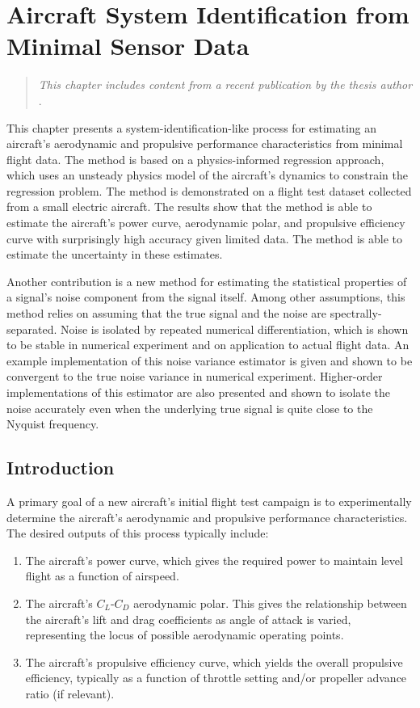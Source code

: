 \chapter{Aircraft System Identification from Minimal Sensor Data}
\label{chap:aircraft_sysid}

\begin{quote}
    \emph{This chapter includes content from a recent publication by the thesis author} \cite{sharpe_physicsinformed_2024}.
\end{quote}

This chapter presents a system-identification-like process for estimating an aircraft's aerodynamic and propulsive performance characteristics from minimal flight data. The method is based on a physics-informed regression approach, which uses an unsteady physics model of the aircraft's dynamics to constrain the regression problem. The method is demonstrated on a flight test dataset collected from a small electric aircraft. The results show that the method is able to estimate the aircraft's power curve, aerodynamic polar, and propulsive efficiency curve with surprisingly high accuracy given limited data. The method is able to estimate the uncertainty in these estimates.

Another contribution is a new method for estimating the statistical properties of a signal's noise component from the signal itself. Among other assumptions, this method relies on assuming that the true signal and the noise are spectrally-separated. Noise is isolated by repeated numerical differentiation, which is shown to be stable in numerical experiment and on application to actual flight data. An example implementation of this noise variance estimator is given and shown to be convergent to the true noise variance in numerical experiment. Higher-order implementations of this estimator are also presented and shown to isolate the noise accurately even when the underlying true signal is quite close to the Nyquist frequency.


\section{Introduction}

A primary goal of a new aircraft's initial flight test campaign is to experimentally determine the aircraft's aerodynamic and propulsive performance characteristics. The desired outputs of this process typically include:

\begin{enumerate}
    \item The aircraft's power curve, which gives the required power to maintain level flight as a function of airspeed.
    \item The aircraft's $C_L$-$C_D$ aerodynamic polar. This gives the relationship between the aircraft's lift and drag coefficients as angle of attack is varied, representing the locus of possible aerodynamic operating points.
    \item The aircraft's propulsive efficiency curve, which yields the overall propulsive efficiency, typically as a function of throttle setting and/or propeller advance ratio (if relevant).
\end{enumerate}


